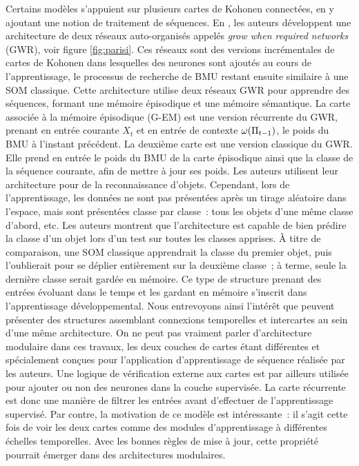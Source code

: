 \documentclass[../main]{subfiles}
\begin{document}
Certains modèles s'appuient sur plusieurs cartes de Kohonen connectées, en y ajoutant une notion de traitement de séquences.
En \cite{parisiLL}, les auteurs développent une architecture de deux réseaux auto-organisés appelés \emph{grow when required networks} (GWR), voir figure \ref{fig:parisi}. Ces réseaux sont des versions incrémentales de cartes de Kohonen dans lesquelles des neurones sont ajoutés au cours de l'apprentissage, le processus de recherche de BMU restant ensuite similaire à une SOM classique.
Cette architecture utilise deux réseaux GWR pour apprendre des séquences, formant une mémoire épisodique et une mémoire sémantique.
La carte associée à la mémoire épisodique (G-EM) est une version récurrente du GWR, prenant en entrée courante $X_t$ et en entrée de contexte $\omega(\Pi_{t-1})$, le poids du BMU à l'instant précédent.
La deuxième carte est une version classique du GWR. Elle prend en entrée le poids du BMU de la carte épisodique ainsi que la classe de la séquence courante, afin de mettre à jour ses poids.
Les auteurs utilisent leur architecture pour de la reconnaissance d'objets. Cependant, lors de l'apprentissage, les données ne sont pas présentées après un tirage aléatoire dans l'espace, mais sont présentées classe par classe~: tous les objets d'une même classe d'abord, etc. Les auteurs montrent que l'architecture est capable de bien prédire la classe d'un objet lors d'un test sur toutes les classes apprises. \`{A} titre de comparaison, une SOM classique apprendrait la classe du premier objet, puis l'oublierait pour se déplier entièrement sur la deuxième classe~; à terme, seule la dernière classe serait gardée en mémoire.
Ce type de structure prenant des entrées évoluant dans le temps et les gardant en mémoire s'inscrit dans l'apprentissage développemental. Nous entrevoyons ainsi l'intérêt que peuvent présenter des structures assemblant connexions temporelles et intercartes au sein d'une même architecture.
On ne peut pas vraiment parler d'architecture modulaire dans ces travaux, les deux couches de cartes étant différentes et spécialement conçues pour l'application d'apprentissage de séquence réalisée par les auteurs. Une logique de vérification externe aux cartes est par ailleurs utilisée pour ajouter ou non des neurones dans la couche supervisée. La carte récurrente est donc une manière de filtrer les entrées avant d'effectuer de l'apprentissage supervisé.
Par contre, la motivation de ce modèle est intéressante~: il s'agit cette fois de voir les deux cartes comme des modules d'apprentissage à différentes échelles temporelles. Avec les bonnes règles de mise à jour, cette propriété pourrait émerger dans des architectures modulaires.
\end{document}
